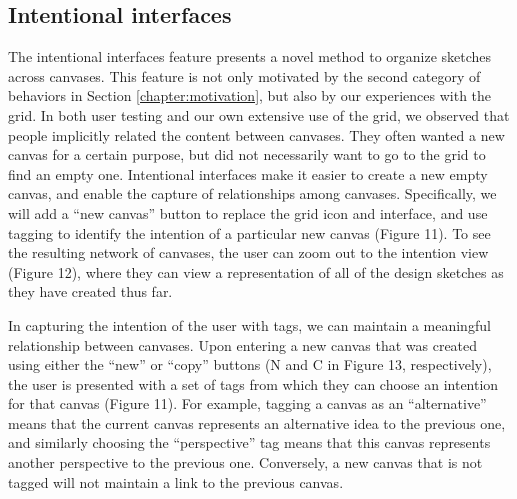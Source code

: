 \subsection{Intentional interfaces}

The intentional interfaces feature presents a novel method to organize sketches across canvases. This feature is not only motivated by the second category of behaviors in Section \ref{chapter:motivation}, but also by our experiences with the grid. In both user testing and our own extensive use of the grid, we observed that people implicitly related the content between canvases. They often wanted a new canvas for a certain purpose, but did not necessarily want to go to the grid to find an empty one. Intentional interfaces make it easier to create a new empty canvas, and enable the capture of relationships among canvases. Specifically, we will add a ``new canvas'' button to replace the grid icon and interface, and use tagging to identify the intention of a particular new canvas (Figure 11). To see the resulting network of canvases, the user can zoom out to the intention view (Figure 12), where they can view a representation of all of the design sketches as they have created thus far. 

In capturing the intention of the user with tags, we can maintain a meaningful relationship between canvases. Upon entering a new canvas that was created using either the ``new'' or ``copy'' buttons (N and C in Figure 13, respectively), the user is presented with a set of tags from which they can choose an intention for that canvas (Figure 11). For example, tagging a canvas as an ``alternative'' means that the current canvas represents an alternative idea to the previous one, and similarly choosing the ``perspective'' tag means that this canvas represents another perspective to the previous one. Conversely, a new canvas that is not tagged will not maintain a link to the previous canvas. 

